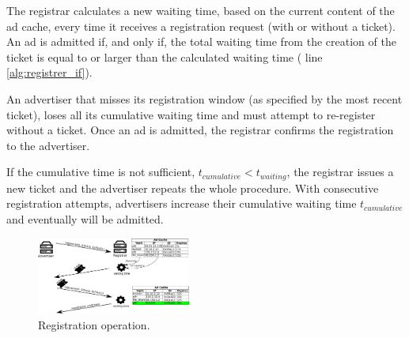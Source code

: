 The registrar calculates a new waiting time, based on the current content of
the ad cache, every time it receives a registration request (with or without
a ticket). %
An ad is admitted if, and only if, the total waiting time from the creation of the ticket is equal to or larger than the calculated waiting time ( line \ref{alg:registrer_if}).

An advertiser that misses its registration window (as specified by the most recent ticket), loses all its cumulative waiting time and must attempt to re-register without a ticket. Once an ad is admitted, the registrar confirms the registration to the advertiser.

If the cumulative time is not sufficient, $t_\textit{cumulative} < t_\textit{waiting}$, the registrar issues a new ticket and the advertiser repeats the whole procedure.
With consecutive registration attempts, advertisers increase their cumulative waiting time $t_\textit{cumulative}$ and eventually will be admitted. 


\begin{figure}
    \includegraphics[width=0.45\textwidth]{img/registration}
    \vspace{-0.15in}
    \caption{Registration operation.}
    \label{fig:registration}
    \vspace{-0.15in}
\end{figure}

